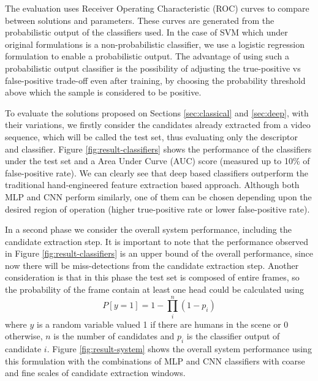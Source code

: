     The evaluation uses Receiver Operating Characteristic (ROC) curves \cite{evaluationMetrics} to compare between solutions and parameters. These curves are generated from the probabilistic output of the classifiers used. In the case of SVM which under original formulations is a non-probabilistic classifier, we use a logistic regression formulation \cite{svmProbabilisticOutput} to enable a probabilistic output. The advantage of using such a probabilistic output classifier is the possibility of adjusting the true-positive vs false-positive trade-off even after training, by choosing the probability threshold above which the sample is considered to be positive.

    To evaluate the solutions proposed on Sections \ref{sec:classical} and \ref{sec:deep}, with their variations, we firstly consider the candidates already extracted from a video sequence, which will be called the test set, thus evaluating only the descriptor and classifier. Figure \ref{fig:result-classifiers} shows the performance of the classifiers under the test set and a Area Under Curve (AUC) score \cite{evaluationMetrics} (measured up to 10\% of false-positive rate). We can clearly see that deep based classifiers outperform the traditional hand-engineered feature extraction based approach. Although both MLP and CNN perform similarly, one of them can be chosen depending upon the desired region of operation (higher true-positive rate or lower false-positive rate).

    \begin{figure*}[!t]
    \centering
    \label{fig:result-classifiers-all}
    \hfil
    \caption{Classifiers performance.}
    \label{fig:result-classifiers}
    \end{figure*}
    In a second phase we consider the overall system performance, including the candidate extraction step. It is important to note that the performance observed in Figure \ref{fig:result-classifiers} is an upper bound of the overall performance, since now there will be miss-detections from the candidate extraction step. Another consideration is that in this phase the test set is composed of entire frames, so the probability of the frame contain at least one head could be calculated using
    \begin{equation}
    P[y=1] = 1 - \prod_i^n (1-p_i)
    \end{equation}
    where $y$ is a random variable valued 1 if there are humans in the scene or 0 otherwise, $n$ is the number of candidates and $p_i$ is the classifier output of candidate $i$. Figure \ref{fig:result-system} shows the overall system performance using this formulation with the combinations of MLP and CNN classifiers with coarse and fine scales of candidate extraction windows.

